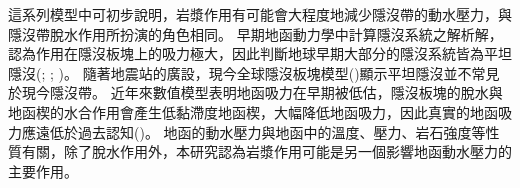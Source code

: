 這系列模型中可初步說明，岩漿作用有可能會大程度地減少隱沒帶的動水壓力，與隱沒帶脫水作用所扮演的角色相同。
早期地函動力學中計算隱沒系統之解析解，認為作用在隱沒板塊上的吸力極大，因此判斷地球早期大部分的隱沒系統皆為平坦隱沒(\citealp{tovish1978mantle}; \citealp{vlaar1983thermal}; \citealp{abbott1994flat})。
隨著地震站的廣設，現今全球隱沒板塊模型(\citealp{hayes2018slab2})顯示平坦隱沒並不常見於現今隱沒帶。
近年來數值模型表明地函吸力在早期被低估，隱沒板塊的脫水與地函楔的水合作用會產生低黏滯度地函楔，大幅降低地函吸力，因此真實的地函吸力應遠低於過去認知(\citealp{Manea2007})。
地函的動水壓力與地函中的溫度、壓力、岩石強度等性質有關，除了脫水作用外，本研究認為岩漿作用可能是另一個影響地函動水壓力的主要作用。


%



